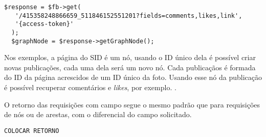 \begin{lstlisting}[caption={Requsição de diversos atributos},label={lst:requisicao8}]
  $response = $fb->get(
   '/415358248866659_511846152551201?fields=comments,likes,link', 
   '{access-token}'
  );
  $graphNode = $response->getGraphNode();
\end{lstlisting}

Nos exemplos, a página do SID é um nó, usando o ID único dela é possível criar novas publicações, cada uma dela será um novo nó. Cada publicaçãos é formada do ID da página acrescidos de um ID único da foto. Usando esse nó da publicação é possível recuperar comentários e \textit{likes}, por exemplo. \cite{facebook2018b}.

O retorno das requisições com campo segue o mesmo padrão que para requisições de nós ou de arestas, com o diferencial do campo solicitado.

\begin{lstlisting}[caption={Retorno das requisições \ref{lst:requisicao7} e \ref{lst:requisicao8} (Campos)}, label={lst:retornoRequisicao8}]
COLOCAR RETORNO
\end{lstlisting}